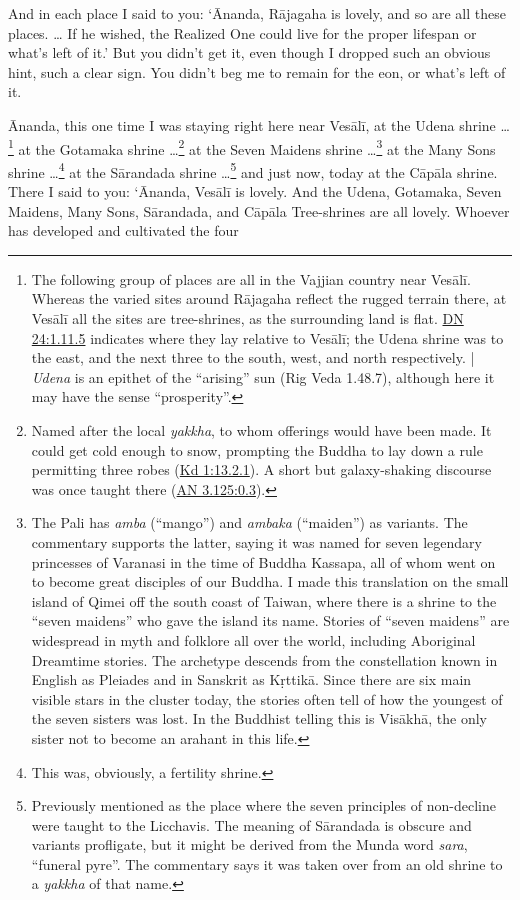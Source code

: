 \documentclass[12pt,openany]{book}%
\begin{document}
And in each place I said to you: ‘Ānanda, \textsanskrit{Rājagaha} is lovely, and so are all these places. … If he wished, the Realized One could live for the proper lifespan or what’s left of it.’ But you didn’t get it, even though I dropped such an obvious hint, such a clear sign. You didn’t beg me to remain for the eon, or what’s left of it. 

Ānanda, this one time I was staying right here near \textsanskrit{Vesālī}, at the Udena shrine …\footnote{The following group of places are all in the Vajjian country near \textsanskrit{Vesālī}. Whereas the varied sites around \textsanskrit{Rājagaha} reflect the rugged terrain there, at \textsanskrit{Vesālī} all the sites are tree-shrines, as the surrounding land is flat. \href{https://suttacentral.net/dn24/en/sujato\#1.11.5}{DN 24:1.11.5} indicates where they lay relative to \textsanskrit{Vesālī}; the Udena shrine was to the east, and the next three to the south, west, and north respectively. | \textit{Udena} is an epithet of the “arising” sun (Rig Veda 1.48.7), although here it may have the sense “prosperity”. } at the Gotamaka shrine …\footnote{Named after the local \textit{yakkha}, to whom offerings would have been made. It could get cold enough to snow, prompting the Buddha to lay down a rule permitting three robes (\href{https://suttacentral.net/pli-tv-kd1/en/sujato\#13.2.1}{Kd 1:13.2.1}). A short but galaxy-shaking discourse was once taught there (\href{https://suttacentral.net/an3.125/en/sujato\#0.3}{AN 3.125:0.3}). } at the Seven Maidens shrine …\footnote{The Pali has \textit{amba} (“mango”) and \textit{ambaka} (“maiden”) as variants. The commentary supports the latter, saying it was named for seven legendary princesses of Varanasi in the time of Buddha Kassapa, all of whom went on to become great disciples of our Buddha. I made this translation on the small island of Qimei off the south coast of Taiwan, where there is a shrine to the “seven maidens” who gave the island its name. Stories of “seven maidens” are widespread in myth and folklore all over the world, including Aboriginal Dreamtime stories. The archetype descends from the constellation known in English as Pleiades and in Sanskrit as \textsanskrit{Kṛttikā}. Since there are six main visible stars in the cluster today, the stories often tell of how the youngest of the seven sisters was lost. In the Buddhist telling this is \textsanskrit{Visākhā}, the only sister not to become an arahant in this life. } at the Many Sons shrine …\footnote{This was, obviously, a fertility shrine. } at the \textsanskrit{Sārandada} shrine …\footnote{Previously mentioned as the place where the seven principles of non-decline were taught to the Licchavis. The meaning of \textsanskrit{Sārandada} is obscure and variants profligate, but it might be derived from the Munda word \textit{sara}, “funeral pyre”. The commentary says it was taken over from an old shrine to a \textit{yakkha} of that name. } and just now, today at the \textsanskrit{Cāpāla} shrine. There I said to you: ‘Ānanda, \textsanskrit{Vesālī} is lovely. And the Udena, Gotamaka, Seven Maidens, Many Sons, \textsanskrit{Sārandada}, and \textsanskrit{Cāpāla} Tree-shrines are all lovely. Whoever has developed and cultivated the four 
\end{document}
